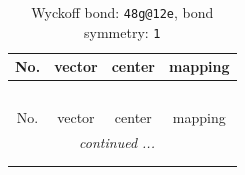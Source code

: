 \documentclass[fleqn,8pt]{jsarticle}
\begin{document}
\renewcommand{\arraystretch}{1.2}
\begin{longtable}{cccc}
\caption{Wyckoff bond: {\tt 48g@12e}, bond symmetry: {\tt 1}}
 \\
 \hline \hline
No. & vector & center & mapping \\ \hline \endfirsthead

\multicolumn{3}{l}{\tablename\ \thetable{}} \\
 \hline \hline
No. & vector & center & mapping \\ \hline \endhead

 \hline \hline
\multicolumn{3}{r}{\footnotesize\it continued ...} \\ \endfoot

 \hline \hline
\multicolumn{3}{r}{} \\ \endlastfoot


\end{longtable}
\end{document}
